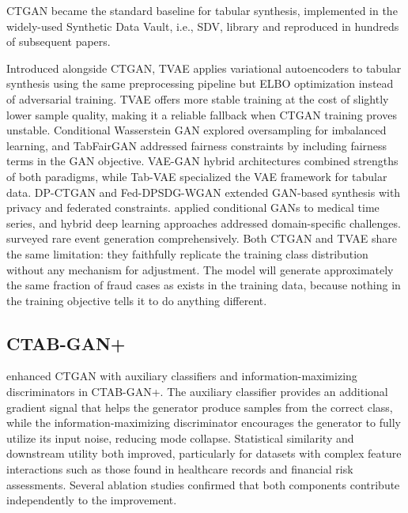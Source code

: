 CTGAN became the standard baseline for tabular synthesis, implemented in the widely-used Synthetic Data Vault, i.e., SDV, library and reproduced in hundreds of subsequent papers.

Introduced alongside CTGAN, TVAE applies variational autoencoders to tabular synthesis using the same preprocessing pipeline but ELBO optimization instead of adversarial training. TVAE offers more stable training at the cost of slightly lower sample quality, making it a reliable fallback when CTGAN training proves unstable. Conditional Wasserstein GAN \cite{engelmann2021cwgan} explored oversampling for imbalanced learning, and TabFairGAN \cite{rajabi2022tabfairgan} addressed fairness constraints by including fairness terms in the GAN objective. VAE-GAN hybrid architectures \cite{camino2020vaegan, pereira2024synthetic} combined strengths of both paradigms, while Tab-VAE \cite{kim2023tabvae} specialized the VAE framework for tabular data. DP-CTGAN \cite{torfi2022dpctgan} and Fed-DPSDG-WGAN \cite{ma2023feddpsdg} extended GAN-based synthesis with privacy and federated constraints. \cite{esteban2017rcgan} applied conditional GANs to medical time series, and hybrid deep learning approaches \cite{mishra2022hybrid, yoon2020gain} addressed domain-specific challenges. \cite{nidhi2024rare} surveyed rare event generation comprehensively. Both CTGAN and TVAE share the same limitation: they faithfully replicate the training class distribution without any mechanism for adjustment. The model will generate approximately the same fraction of fraud cases as exists in the training data, because nothing in the training objective tells it to do anything different.

\subsection{CTAB-GAN+}

\cite{zhao2022ctabgan} enhanced CTGAN with auxiliary classifiers and information-maximizing discriminators in CTAB-GAN+. The auxiliary classifier provides an additional gradient signal that helps the generator produce samples from the correct class, while the information-maximizing discriminator encourages the generator to fully utilize its input noise, reducing mode collapse. Statistical similarity and downstream utility both improved, particularly for datasets with complex feature interactions such as those found in healthcare records and financial risk assessments. Several ablation studies confirmed that both components contribute independently to the improvement.

